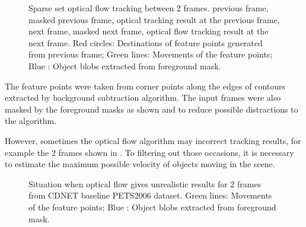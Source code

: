\begin{figure}[htb]
  \centering
  \iffalse
  \subfigure [] {
    \texttt{[image: optical/between/prev\_mask2]}
    \label{imp:of:prev_mask}
  }
  \fi
  \caption{Sparse set optical flow tracking between 2 frames.  previous frame,  masked previous frame,  optical tracking result at the previous frame,  next frame,  masked next frame,  optical flow tracking result at the next frame. {\color{red}Red circles}: Destinations of feature points generated from previous frame; {\color{dkgreen}Green lines}: Movements of the feature points; {\color{blue}Blue }: Object blobs extracted from foreground mask.}
  \label{imp:of}
\end{figure}

The feature points were taken from corner points along the edges of contours extracted by background subtraction algorithm. The input frames were also masked by the foreground masks as shown   and  to reduce possible distractions to the algorithm.

However, sometimes the optical flow algorithm may  incorrect tracking results, for example the 2 frames shown in . To filtering out those occasions, it is necessary to estimate the maximum possible velocity of objects moving in the scene.

\begin{figure}[htb]
  \centering
  \caption{Situation when optical flow gives unrealistic results for 2 frames from CDNET baseline PETS2006 dataset. {\color{dkgreen}Green lines}: Movements of the feature points; {\color{blue}Blue }: Object blobs extracted from foreground mask.}
  \label{imp:of:error}
\end{figure}

